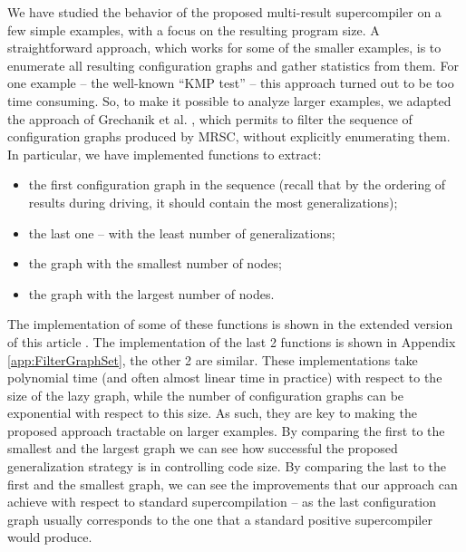 \documentclass[submission,copyright,creativecommons]{eptcs}
\begin{document}
We have studied the behavior of the proposed multi-result supercompiler on a few simple
examples, with a focus on the resulting program size.
A straightforward approach, which works for some of the smaller examples,
is to enumerate all resulting configuration graphs and gather statistics from them.
For one example -- the well-known ``KMP test'' -- this approach turned out to be too
time consuming.
So, to make it possible to analyze larger examples, we adapted the approach 
of Grechanik et al. \cite{Romanenko2014StagedMRSC}, which permits to filter
the sequence of configuration graphs produced by MRSC, without explicitly
enumerating them.
In particular, we have implemented functions to extract:
\begin{itemize}
  \item the first configuration graph in the sequence (recall that by the ordering of 
    results during driving, it should contain the most generalizations);
  \item the last one -- with the least number of generalizations;
  \item the graph with the smallest number of nodes;
  \item the graph with the largest number of nodes.
\end{itemize}
\ifVptVer
The implementation of some of these functions is shown in
the extended version of this article \cite{krustev2020controlling}.
\else
The implementation of the last 2 functions is shown in
Appendix \ref{app:FilterGraphSet},
the other 2 are similar.
\fi
These implementations take polynomial time (and often almost linear time in practice)  
with respect to the size of the lazy graph,
while the number of configuration graphs can be exponential with respect to this size.
As such, they are key to making the proposed approach tractable on larger examples.
By comparing the first to the smallest and the largest graph we can see how 
successful the proposed generalization strategy is in controlling code size.
By comparing the last to the first and the smallest graph, we can see the improvements
that our approach can achieve with respect to standard supercompilation --
as the last configuration graph usually corresponds to the one that a standard positive supercompiler would produce.
\end{document}
